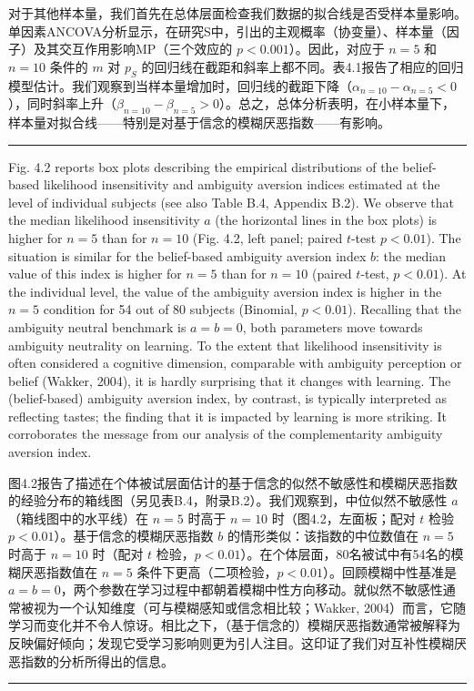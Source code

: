 \documentclass[12pt,a4paper]{article}
\newenvironment{original}
  {\par\vspace{0.5em}\noindent\color{black}\ignorespaces}
  {\par\vspace{0.3em}}
\newenvironment{translation}
  {\par\noindent\color{transblue}\ignorespaces}
  {\par\vspace{0.8em}\hrule\vspace{0.5em}}
\begin{document}
\begin{translation}
对于其他样本量，我们首先在总体层面检查我们数据的拟合线是否受样本量影响。单因素ANCOVA分析显示，在研究S中，引出的主观概率（协变量）、样本量（因子）及其交互作用影响MP（三个效应的 $p < 0.001$）。因此，对应于 $n = 5$ 和 $n = 10$ 条件的 $m$ 对 $p_S$ 的回归线在截距和斜率上都不同。表4.1报告了相应的回归模型估计。我们观察到当样本量增加时，回归线的截距下降（$\alpha_{n=10} - \alpha_{n=5} < 0$），同时斜率上升（$\beta_{n=10} - \beta_{n=5} > 0$）。总之，总体分析表明，在小样本量下，样本量对拟合线——特别是对基于信念的模糊厌恶指数——有影响。
\end{translation}
\begin{original}
Fig. 4.2 reports box plots describing the empirical distributions of the belief-based likelihood insensitivity and ambiguity aversion indices estimated at the level of individual subjects (see also Table B.4, Appendix B.2). We observe that the median likelihood insensitivity $a$ (the horizontal lines in the box plots) is higher for $n = 5$ than for $n = 10$ (Fig. 4.2, left panel; paired $t$-test $p < 0.01$). The situation is similar for the belief-based ambiguity aversion index $b$: the median value of this index is higher for $n = 5$ than for $n = 10$ (paired $t$-test, $p < 0.01$). At the individual level, the value of the ambiguity aversion index is higher in the $n = 5$ condition for 54 out of 80 subjects (Binomial, $p < 0.01$). Recalling that the ambiguity neutral benchmark is $a = b = 0$, both parameters move towards ambiguity neutrality on learning. To the extent that likelihood insensitivity is often considered a cognitive dimension, comparable with ambiguity perception or belief (Wakker, 2004), it is hardly surprising that it changes with learning. The (belief-based) ambiguity aversion index, by contrast, is typically interpreted as reflecting tastes; the finding that it is impacted by learning is more striking. It corroborates the message from our analysis of the complementarity ambiguity aversion index.
\end{original}

\begin{translation}
图4.2报告了描述在个体被试层面估计的基于信念的似然不敏感性和模糊厌恶指数的经验分布的箱线图（另见表B.4，附录B.2）。我们观察到，中位似然不敏感性 $a$（箱线图中的水平线）在 $n = 5$ 时高于 $n = 10$ 时（图4.2，左面板；配对 $t$ 检验 $p < 0.01$）。基于信念的模糊厌恶指数 $b$ 的情形类似：该指数的中位数值在 $n = 5$ 时高于 $n = 10$ 时（配对 $t$ 检验，$p < 0.01$）。在个体层面，80名被试中有54名的模糊厌恶指数值在 $n = 5$ 条件下更高（二项检验，$p < 0.01$）。回顾模糊中性基准是 $a = b = 0$，两个参数在学习过程中都朝着模糊中性方向移动。就似然不敏感性通常被视为一个认知维度（可与模糊感知或信念相比较；Wakker, 2004）而言，它随学习而变化并不令人惊讶。相比之下，（基于信念的）模糊厌恶指数通常被解释为反映偏好倾向；发现它受学习影响则更为引人注目。这印证了我们对互补性模糊厌恶指数的分析所得出的信息。
\end{translation}
\end{document}
